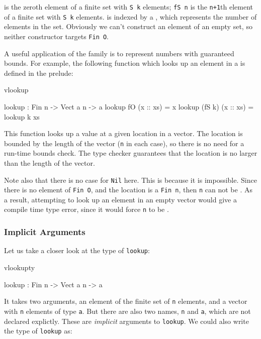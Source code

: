 \noindent
{} is the zeroth element of a finite set with \texttt{S k} elements; 
\texttt{fS n} is the
\texttt{n+1}th element of a finite set with \texttt{S k} elements. 
 is indexed by a , which
represents the number of elements in the set. Obviously we can't construct an
element of an empty set, so neither constructor targets \texttt{Fin O}.

A useful application of the  family is to represent numbers with
guaranteed bounds. For example, the following function which looks up an element in a 
is defined in the prelude:

\begin{SaveVerbatim}{vlookup}

lookup : Fin n -> Vect a n -> a
lookup fO     (x :: xs) = x
lookup (fS k) (x :: xs) = lookup k xs

\end{SaveVerbatim}

\noindent
This function looks up a value at a given location in a vector. The location is
bounded by the length of the vector (\texttt{n} in each case), so there is no
need for a run-time bounds check. The type checker guarantees that the location
is no larger than the length of the vector.

Note also that there is no case for \texttt{Nil} here. This is because it is
impossible. Since there is no element of \texttt{Fin O}, and the location is a
\texttt{Fin n}, then \texttt{n} can not be .  As a result, attempting to
look up an element in an empty vector would give a compile time type error,
since it would force \texttt{n} to be .

\subsubsection{Implicit Arguments}

Let us take a closer look at the type of \texttt{lookup}:

\begin{SaveVerbatim}{vlookupty}

lookup : Fin n -> Vect a n -> a

\end{SaveVerbatim}

\noindent
It takes two arguments, an element of the finite set of \texttt{n} elements, and a vector
with \texttt{n} elements of type \texttt{a}. But there are also two names, 
\texttt{n} and \texttt{a}, which are not declared explictly. These are \emph{implicit}
arguments to \texttt{lookup}. We could also write the type of \texttt{lookup} as:

